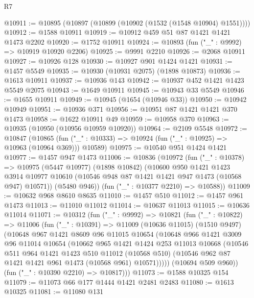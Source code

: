 \begin{lexlean}{R7}
\begin{coremodule}
@10911 := @10895 (@10897 (@10899 (@10902 (@1532 (@1548 @10904) @1551))))
@10912 := @1588 @10911
@10919 := @10912 @459 @51 @87 @1421 @1421 @1473 @2202
@10920 := @1752 @10911
@10924 := @10893 (fun ("_" : @9992) => @10919 @10920 @2206)
@10925 := @9991 @2210
@10926 := @2068 @10911
@10927 := @10926 @128
@10930 := @10927 @901 @1424 @1421
@10931 := @1457 @5549
@10935 := @10930 (@10931 @2075) (@1898 @10873)
@10936 := @1613 @10911
@10937 := @10936 @143
@10942 := @10937 @452 @1421 @1423 @5549 @2075
@10943 := @1649 @10911
@10945 := @10943 @33 @5549
@10946 := @1655 @10911
@10949 := @10945 (@1654 (@10946 @33))
@10950 := @10942 @10949
@10951 := @10936 @371
@10956 := @10951 @87 @1421 @1421 @370 @1473
@10958 := @1622 @10911 @49
@10959 := @10958 @370
@10963 := @10935 (@10950 (@10956 @10959 @10920))
@10964 := @2109 @5548
@10972 := @10847
    (@10865 (fun ("_" : @10333) => @10924 (fun ("_" : @10925) => @10963 (@10964 @369))) @10589)
@10975 := @10540 @951 @1424 @1421
@10977 := @1457 @947 @1473
@11006 := @10836
    (@10972
      (fun ("_" : @10378) =>
      @10975
        (@5447 @10977)
        (@1898 @10842)
        (@10600
          @950
          @1421
          @1423
          @3914
          @10977
          @10610
          (@10546 @948 @87 @1421 @1421 @947 @1473 (@10568 @947) @10571))
        (@5480 @946))
      (fun ("_" : @10377 @2210) => @10588))
@11009 := @10632 @968 @8610 @8635
@11010 := @1457 @510
@11012 := @1457 @961 @1473
@11013 := @11010 @11012
@11014 := @10637 @11013
@11015 := @10636 @11014
@11071 := @10312
    (fun ("_" : @9992) =>
    @10821
      (fun ("_" : @10822) =>
      @11006
        (fun ("_" : @10391) =>
        @11009
          (@10636 @11015)
          (@1510 @9497)
          (@10648
            @967
            @1421
            @8609
            @96
            @11015
            @10654
            (@10648
              @966
              @1421
              @3009
              @96
              @11014
              @10654
              (@10662
                @965
                @1421
                @1424
                @253
                @11013
                @10668
                (@10546
                  @511
                  @964
                  @1421
                  @1423
                  @510
                  @11012
                  (@10568 @510)
                  (@10546 @962 @87 @1421 @1421 @961 @1473 (@10568 @961) @10571)))))
          (@10694 @509 @960))
        (fun ("_" : @10390 @2210) => @10817)))
@11073 := @1588 @10325 @154
@11079 := @11073 @66 @177 @1444 @1421 @2481 @2483
@11080 := @1613 @10325
@11081 := @11080 @131

\end{coremodule}
\end{lexlean}
